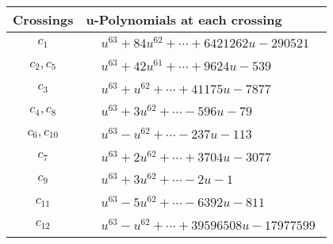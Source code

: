 \documentclass[1p]{elsarticle_modified}
\theoremstyle{definition}
\begin{document}
\begin{tabular}{m{50pt}|m{274pt}}
Crossings & \hspace{64pt}u-Polynomials at each crossing \\
\hline $$\begin{aligned}c_{1}\end{aligned}$$&$\begin{aligned}
&u^{63}+84 u^{62}+\cdots+6421262 u-290521
\end{aligned}$\\
\hline $$\begin{aligned}c_{2},c_{5}\end{aligned}$$&$\begin{aligned}
&u^{63}+42 u^{61}+\cdots+9624 u-539
\end{aligned}$\\
\hline $$\begin{aligned}c_{3}\end{aligned}$$&$\begin{aligned}
&u^{63}+u^{62}+\cdots+41175 u-7877
\end{aligned}$\\
\hline $$\begin{aligned}c_{4},c_{8}\end{aligned}$$&$\begin{aligned}
&u^{63}+3 u^{62}+\cdots-596 u-79
\end{aligned}$\\
\hline $$\begin{aligned}c_{6},c_{10}\end{aligned}$$&$\begin{aligned}
&u^{63}- u^{62}+\cdots-237 u-113
\end{aligned}$\\
\hline $$\begin{aligned}c_{7}\end{aligned}$$&$\begin{aligned}
&u^{63}+2 u^{62}+\cdots+3704 u-3077
\end{aligned}$\\
\hline $$\begin{aligned}c_{9}\end{aligned}$$&$\begin{aligned}
&u^{63}+3 u^{62}+\cdots-2 u-1
\end{aligned}$\\
\hline $$\begin{aligned}c_{11}\end{aligned}$$&$\begin{aligned}
&u^{63}-5 u^{62}+\cdots-6392 u-811
\end{aligned}$\\
\hline $$\begin{aligned}c_{12}\end{aligned}$$&$\begin{aligned}
&u^{63}- u^{62}+\cdots+39596508 u-17977599
\end{aligned}$\\
\hline
\end{tabular}\\~\\
\end{document}

